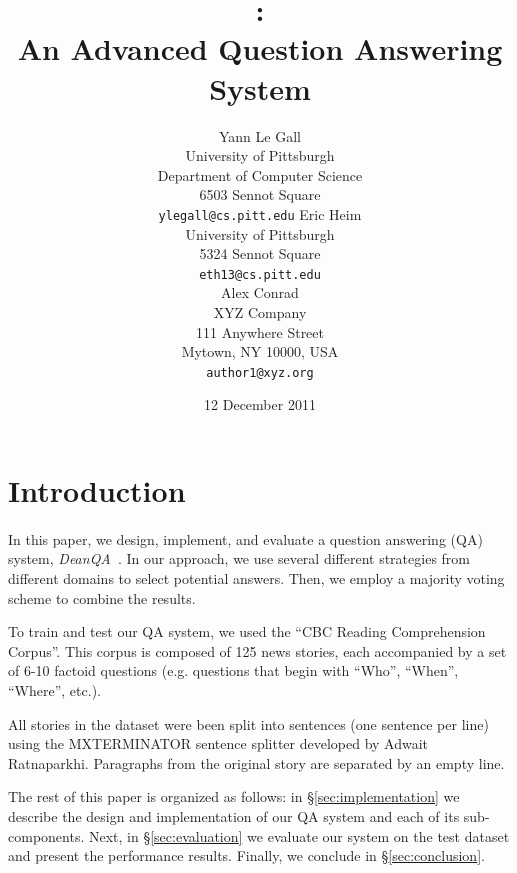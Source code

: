 \documentclass[11pt,letterpaper]{article}
\title{\name: \\An Advanced Question Answering System}
\author{
	Yann Le Gall\\
    University of Pittsburgh\\	
	Department of Computer Science\\
	6503 Sennot Square\\
    {\tt ylegall@cs.pitt.edu}
\And
	Eric Heim\\
    University of Pittsburgh\\	
	5324 Sennot Square\\
    {\tt eth13@cs.pitt.edu}
	\\
\And
	Alex Conrad\\
    XYZ Company\\
    111 Anywhere Street\\
    Mytown, NY 10000, USA\\
    {\tt author1@xyz.org}
}
\date{12 December 2011}
\newcommand{\name}{\emph{DeanQA~}}
\begin{document}
\maketitle





\section{Introduction}
\label{sec:intro}
\paragraph{}
In this paper, we design, implement, and evaluate a question answering
(QA) system, \name. In our approach, we use several different strategies from
different domains to select potential answers. Then, we employ a
majority voting scheme to combine the results.

To train and test our QA system, we used the ``CBC Reading
Comprehension Corpus''. This corpus is composed of 125 news stories,
each accompanied by a set of 6-10 factoid questions (e.g. questions
that begin with ``Who'', ``When'', ``Where'', etc.).

All stories in the dataset were been split into sentences (one
sentence per line) using the MXTERMINATOR sentence splitter developed
by Adwait Ratnaparkhi.  Paragraphs from the original story are
separated by an empty line. 

The rest of this paper is organized as follows: in
\S\ref{sec:implementation} we describe the design and implementation
of our QA system and each of its sub-components. Next, in
\S\ref{sec:evaluation} we evaluate our system on the test dataset and
present the performance results. Finally, we conclude in
\S\ref{sec:conclusion}.
\end{document}
